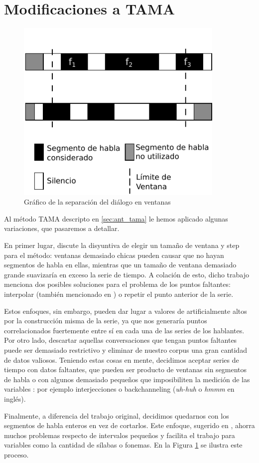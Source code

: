 \section{Modificaciones a TAMA}
\label{sec:tama_modifications}


\begin{figure}[b!]
\centering
\includegraphics[width=10cm]{images/tama_improved.pdf}
\caption{Gráfico de la separación del diálogo en ventanas}

\label{fig:tama_improved}
\end{figure}
Al método TAMA descripto en \ref{sec:ant_tama} le hemos aplicado algunas variaciones, que pasaremos a detallar.

En primer lugar, \cite{KOU2008.2} discute la disyuntiva de elegir un tamaño de ventana y step para el método: ventanas demasiado chicas pueden causar que no hayan segmentos de habla en ellas, mientras que un tamaño de ventana demasiado grande suavizaría en exceso la serie de tiempo. A colación de esto, dicho trabajo menciona dos posibles soluciones para el problema de los puntos faltantes: interpolar (también mencionado en \cite{DEL2013}) o repetir el punto anterior de la serie.


Estos enfoques, sin embargo, pueden dar lugar a valores de \entrainment artificialmente altos por la construcción misma de la serie, ya que nos generaría puntos correlacionados fuertemente entre sí en cada una de las series de los hablantes. Por otro lado, descartar aquellas conversaciones que tengan puntos faltantes puede ser demasiado restrictivo y eliminar de nuestro corpus una gran cantidad de datos valiosos. Teniendo estas cosas en mente, decidimos aceptar series de tiempo con datos faltantes, que pueden ser producto de ventanas sin segmentos de habla o con algunos demasiado pequeños que imposibiliten la medición de las variables \ap: por ejemplo interjecciones o backchanneling (\emph{uh-huh} o \emph{hmmm} en inglés).

Finalmente, a diferencia del trabajo original, decidimos quedarnos con los segmentos de habla enteros en vez de cortarlos. Este enfoque, sugerido en \cite{DEL2013}, ahorra muchos problemas respecto de intervalos pequeños y facilita el trabajo para variables \ap como la cantidad de sílabas o fonemas. En la Figura \ref{fig:tama_improved} se ilustra este proceso.


